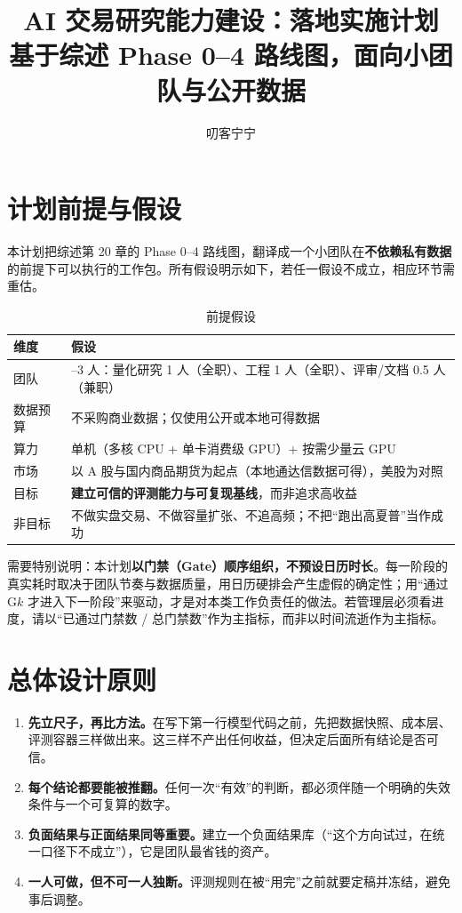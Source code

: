 \documentclass[11pt,a4paper]{ctexart}
\title{\bfseries AI 交易研究能力建设：落地实施计划\\\large 基于综述 Phase 0--4 路线图，面向小团队与公开数据}
\author{\large 叨客宁宁}
\date{}
\begin{document}
\maketitle

\section{计划前提与假设}

本计划把综述第 20 章的 Phase 0--4 路线图，翻译成一个小团队在\textbf{不依赖私有数据}的前提下可以执行的工作包。所有假设明示如下，若任一假设不成立，相应环节需重估。

\begin{table}[htbp]
\centering
\caption{前提假设}
\label{tab:assumptions}
\begin{tabular}{@{}>{\raggedright\arraybackslash}p{3.4cm}>{\raggedright\arraybackslash}p{11.0cm}@{}}
\toprule
维度 & 假设 \\
\midrule
团队 & 1--3 人：量化研究 1 人（全职）、工程 1 人（全职）、评审/文档 0.5 人（兼职） \\
数据预算 & 不采购商业数据；仅使用公开或本地可得数据 \\
算力 & 单机（多核 CPU + 单卡消费级 GPU）+ 按需少量云 GPU \\
市场 & 以 A 股与国内商品期货为起点（本地通达信数据可得），美股为对照 \\
目标 & \textbf{建立可信的评测能力与可复现基线}，而非追求高收益 \\
非目标 & 不做实盘交易、不做容量扩张、不追高频；不把“跑出高夏普”当作成功 \\
\bottomrule
\end{tabular}
\end{table}

\noindent 需要特别说明：本计划\textbf{以门禁（Gate）顺序组织，不预设日历时长}。每一阶段的真实耗时取决于团队节奏与数据质量，用日历硬排会产生虚假的确定性；用“通过 G$k$ 才进入下一阶段”来驱动，才是对本类工作负责任的做法。若管理层必须看进度，请以“已通过门禁数 / 总门禁数”作为主指标，而非以时间流逝作为主指标。

\section{总体设计原则}

\begin{enumerate}
  \item \textbf{先立尺子，再比方法。}在写下第一行模型代码之前，先把数据快照、成本层、评测容器三样做出来。这三样不产出任何收益，但决定后面所有结论是否可信。
  \item \textbf{每个结论都要能被推翻。}任何一次“有效”的判断，都必须伴随一个明确的失效条件与一个可复算的数字。
  \item \textbf{负面结果与正面结果同等重要。}建立一个负面结果库（“这个方向试过，在统一口径下不成立”），它是团队最省钱的资产。
  \item \textbf{一人可做，但不可一人独断。}评测规则在被“用完”之前就要定稿并冻结，避免事后调整。
\end{enumerate}
\end{document}
